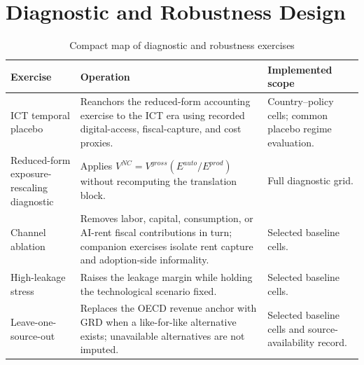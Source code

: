\section{Diagnostic and Robustness Design}\label{app:robustness_design}

\begin{table}[H]
\centering
\small
\caption{Compact map of diagnostic and robustness exercises}
\label{tab:robustness_design_clean}
\begin{tabular}{@{}>{\raggedright\arraybackslash}p{}>{\raggedright\arraybackslash}p{}>{\raggedright\arraybackslash}p{}@{}}
\toprule
Exercise & Operation & Implemented scope \\
\midrule
ICT temporal placebo & Reanchors the reduced-form accounting exercise to the ICT era using recorded digital-access, fiscal-capture, and cost proxies. & Country--policy cells; common placebo regime evaluation. \\
Reduced-form exposure-rescaling diagnostic & Applies $V^{NC}=V^{gross}(E^{auto}/E^{prod})$ without recomputing the translation block. & Full diagnostic grid. \\
Channel ablation & Removes labor, capital, consumption, or AI-rent fiscal contributions in turn; companion exercises isolate rent capture and adoption-side informality. & Selected baseline cells. \\
High-leakage stress & Raises the leakage margin while holding the technological scenario fixed. & Selected baseline cells. \\
Leave-one-source-out & Replaces the OECD revenue anchor with GRD when a like-for-like alternative exists; unavailable alternatives are not imputed. & Selected baseline cells and source-availability record. \\
\bottomrule
\end{tabular}
\end{table}
